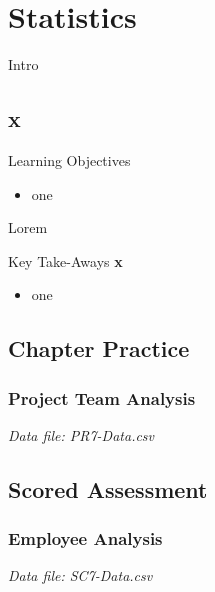 \chapter{Statistics}\label{ch08:statistics}


Intro

\section{x}

\begin{center}
	\begin{objbox}{Learning Objectives}
		\begin{itemize}
			\setlength{\itemsep}{0pt}
			\setlength{\parskip}{0pt}
			\setlength{\parsep}{0pt}
			
			\item one

		\end{itemize}
	\end{objbox}
\end{center}

Lorem

\begin{center}
	\begin{tkwbox}{Key Take-Aways}
		\textbf{x}
		\\
		\begin{itemize}
			\setlength{\itemsep}{0pt}
			\setlength{\parskip}{0pt}
			\setlength{\parsep}{0pt}
			
			\item one
			
		\end{itemize}
	\end{tkwbox}
\end{center}

\section{Chapter Practice}

\subsection{Project Team Analysis}

\textit{Data file: PR7-Data.csv}


\section{Scored Assessment}

\subsection{Employee Analysis}

\textit{Data file: SC7-Data.csv}

